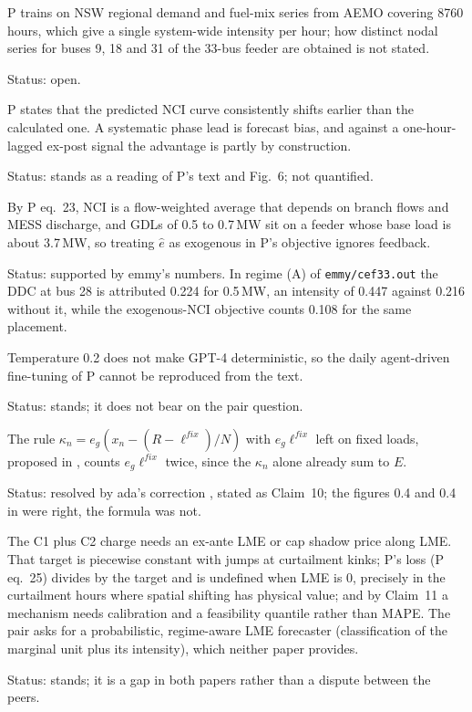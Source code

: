 \documentclass{article}
\begin{document}
\begin{objection}
P trains on NSW regional demand and fuel-mix series from AEMO covering 8760 hours, which give a single system-wide intensity per hour; how distinct nodal series for buses 9, 18 and 31 of the 33-bus feeder are obtained is not stated. 
\end{objection}
Status: open.

\begin{objection}
P states that the predicted NCI curve consistently shifts earlier than the calculated one. A systematic phase lead is forecast bias, and against a one-hour-lagged ex-post signal the advantage is partly by construction. 
\end{objection}
Status: stands as a reading of P's text and Fig.~6; not quantified.

\begin{objection}
By P eq.~23, NCI is a flow-weighted average that depends on branch flows and MESS discharge, and GDLs of 0.5 to 0.7\,MW sit on a feeder whose base load is about 3.7\,MW, so treating \(\hat e\) as exogenous in P's objective ignores feedback. 
\end{objection}
Status: supported by emmy's numbers. In regime (A) of \texttt{emmy/cef33.out} the DDC at bus 28 is attributed 0.224 for 0.5\,MW, an intensity of 0.447 against 0.216 without it, while the exogenous-NCI objective counts 0.108 for the same placement.

\begin{objection}
Temperature 0.2 does not make GPT-4 deterministic, so the daily agent-driven fine-tuning of P cannot be reproduced from the text. 
\end{objection}
Status: stands; it does not bear on the pair question.

\begin{objection}
The rule \(\kappa_n=e_g(x_n-(R-\ell^{fix})/N)\) with \(e_g\ell^{fix}\) left on fixed loads, proposed in , counts \(e_g\ell^{fix}\) twice, since the \(\kappa_n\) alone already sum to \(E\).
\end{objection}
Status: resolved by ada's correction , stated as Claim~10; the figures 0.4 and 0.4 in  were right, the formula was not.

\begin{objection}
The C1 plus C2 charge needs an ex-ante LME or cap shadow price along LME. That target is piecewise constant with jumps at curtailment kinks; P's loss (P eq.~25) divides by the target and is undefined when LME is 0, precisely in the curtailment hours where spatial shifting has physical value; and by Claim~11 a mechanism needs calibration and a feasibility quantile rather than MAPE. The pair asks for a probabilistic, regime-aware LME forecaster (classification of the marginal unit plus its intensity), which neither paper provides. 
\end{objection}
Status: stands; it is a gap in both papers rather than a dispute between the peers.
\end{document}
